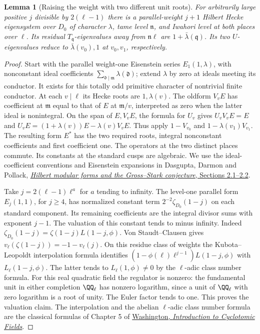 \documentclass[a4paper,11pt]{article}
\newtheorem{lemma}[proposition]{Lemma}
\theoremstyle{definition}
\theoremstyle{remark}
\numberwithin{equation}{section}
\begin{document}
\begin{lemma}[Raising the weight with two different unit roots]
\leavevmode\label{lem:weightpair578}
For arbitrarily large positive \(j\) divisible by
\(2(\ell-1)\) there is a parallel-weight \(j+1\) Hilbert
Hecke eigensystem over \(D_0\) of character \(\lambda\),
tame level \(\mathfrak n\), and Iwahori level at both places
over \(\ell\). Its residual \(T_\mathfrak q\)-eigenvalues
away from \(\mathfrak n\ell\) are \(1+\bar\lambda(\mathfrak q)\).
Its two \(U\)-eigenvalues reduce to
\(\bar\lambda(v_0),1\) at \(v_0,v_1\), respectively.
\end{lemma}
\begin{proof}
Start with the parallel weight-one Eisenstein series
\(E_1(1,\lambda)\), with nonconstant ideal coefficients
\(\sum_{\mathfrak d\mid\mathfrak m}\lambda(\mathfrak d)\);
extend \(\lambda\) by zero at ideals meeting its conductor.
It exists for this totally odd primitive character of nontrivial
finite conductor. At each \(v\mid\ell\) its Hecke roots are
\(1,\lambda(v)\). The oldform \(V_v E\) has coefficient at
\(\mathfrak m\) equal to that of \(E\) at \(\mathfrak m/v\),
interpreted as zero when the latter ideal is nonintegral.
On the span of \(E,V_v E\), the formula for \(U_v\) gives
\(U_vV_v E=E\) and
\(U_v E=(1+\lambda(v))E-\lambda(v)V_v E\).
Thus apply \(1-V_{v_0}\) and \(1-\lambda(v_1)V_{v_1}\).
The resulting form \(E^*\) has the two required roots,
integral nonconstant coefficients and first coefficient one.
The operators at the two distinct places commute. Its
constants at the standard cusps are algebraic. We use the
ideal-coefficient conventions and Eisenstein expansions in
Dasgupta, Darmon and Pollack,
\href{https://services.math.duke.edu/~dasgupta/papers/Dasgupta-Darmon-Pollack.pdf}
{\emph{Hilbert modular forms and the Gross--Stark conjecture}, Sections 2.1--2.2}.

Take \(j=2(\ell-1)\ell^a\) for \(a\) tending to infinity.
The level-one parallel form \(E_j(1,1)\), for \(j\ge4\),
has normalized constant term \(2^{-2}\zeta_{D_0}(1-j)\)
on each standard component. Its remaining coefficients
are the integral divisor sums with exponent \(j-1\).
The valuation of this constant tends to minus infinity.
Indeed \(\zeta_{D_0}(1-j)=\zeta(1-j)L(1-j,\phi)\).
Von Staudt--Clausen gives
\(v_\ell(\zeta(1-j))=-1-v_\ell(j)\).
On this residue class of weights the Kubota--Leopoldt
interpolation formula identifies
\((1-\phi(\ell)\ell^{j-1})L(1-j,\phi)\) with
\(L_\ell(1-j,\phi)\). The latter tends to
\(L_\ell(1,\phi)\ne0\) by the \(\ell\)-adic class number
formula. For this real quadratic field the regulator is
nonzero: the fundamental unit in either completion
\(\QQ_\ell\) has nonzero logarithm, since a unit of
\(\QQ_\ell\) with zero logarithm is a root of unity. The
Euler factor tends to one. This proves the valuation claim.
The interpolation and the abelian \(\ell\)-adic class number
formula are the classical formulas of Chapter 5 of
\href{https://link.springer.com/book/10.1007/978-1-4612-1934-7}
{Washington, \emph{Introduction to Cyclotomic Fields}}.


\end{proof}
\end{document}
